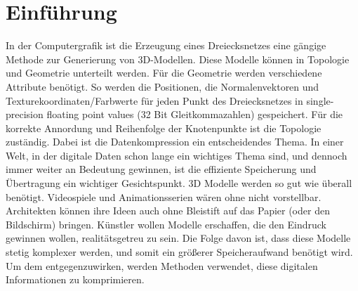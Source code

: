 \section{Einführung}

In der Computergrafik ist die Erzeugung eines Dreiecksnetzes eine gängige Methode zur Generierung von 3D-Modellen. Diese Modelle können in Topologie und Geometrie unterteilt werden. Für die Geometrie werden verschiedene Attribute benötigt. 
So werden die Positionen, die Normalenvektoren und Texturekoordinaten/Farbwerte für jeden Punkt des Dreiecksnetzes in single-precision floating point values (32 Bit Gleitkommazahlen) gespeichert. 
Für die korrekte Annordung und Reihenfolge der Knotenpunkte ist die Topologie zuständig. 
Dabei ist die Datenkompression ein entscheidendes Thema. 
In einer Welt, in der digitale Daten schon lange ein wichtiges Thema sind, und dennoch immer weiter an Bedeutung gewinnen, ist die effiziente Speicherung und Übertragung ein wichtiger Gesichtspunkt.
3D Modelle werden so gut wie überall benötigt. 
Videospiele und Animationsserien wären ohne nicht vorstellbar. 
Architekten können ihre Ideen auch ohne Bleistift auf das Papier (oder den Bildschirm) bringen.
Künstler wollen Modelle erschaffen, die den Eindruck gewinnen wollen, realitätsgetreu zu sein. 
Die Folge davon ist, dass diese Modelle stetig komplexer werden, und somit ein größerer Speicheraufwand benötigt wird. 
Um dem entgegenzuwirken, werden Methoden verwendet, diese digitalen Informationen zu komprimieren. \newline


